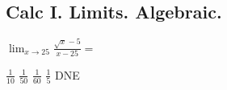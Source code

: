\documentclass[addpoints]{exam}
\begin{document}
\begin{questions}
\section{Calc I. Limits. Algebraic.}
\question $\lim_{x\to 25} \frac{\sqrt x-5}{x-25} = $
\begin{oneparcheckboxes}
	\correctchoice $\frac1{10}$
	\choice $\frac1{50}$ %
	\choice $\frac1{60}$
	\choice $\frac15$
	\choice DNE
	\end{oneparcheckboxes}
\end{questions}
\end{document}

